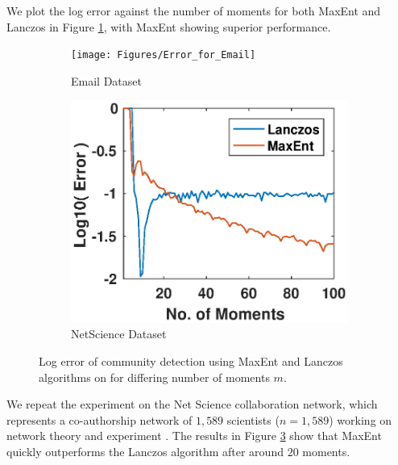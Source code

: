 \documentclass{article}
\begin{document}
We plot the log error against the number of moments for both MaxEnt and Lanczos in Figure \ref{fig:emailerror}, with MaxEnt showing superior performance.

\begin{figure}[t]
	\centering
	\begin{subfigure}{.5\linewidth}
		\centering
	\texttt{[image: Figures/Error\_for\_Email]}
\caption{Email Dataset}
\label{fig:emailerror}	
	\end{subfigure}%
	\begin{subfigure}{.5\linewidth}
		\centering
		\includegraphics[trim=0.2cm 0cm 1cm 0.5cm, clip, width=1.0\linewidth]{Figures/Error_for_Netscience}
		\caption{NetScience Dataset}
		\label{fig:netscienceerror}
	\end{subfigure}
	\caption{Log error of community detection using MaxEnt and Lanczos algorithms on for differing number of moments $m$.}
	\label{fig:netscience}
\end{figure}

We repeat the experiment on the Net Science collaboration network, which represents a co-authorship network of $1,589$ scientists ($n = 1,589$) working on network theory and experiment \citep{newman2006finding}. The results in Figure \ref{fig:netscience} show that MaxEnt quickly outperforms the Lanczos algorithm after around $20$ moments.
\end{document}
